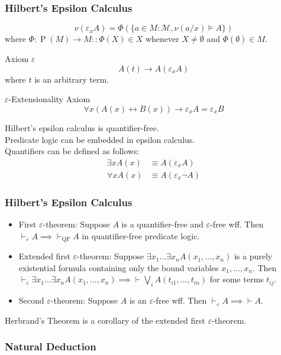 \documentclass[UTF8,11pt,colorlinks,compress,openany]{beamer}%
\begin{document}
\begin{frame}\frametitle{Hilbert's Epsilon Calculus}
\[\nu(\varepsilon_x A)=\Phi\left(\{a\in M:\mathcal{M},\nu(a/x)\vDash A\}\right)\]
where $\Phi:\operatorname{P}(M)\to M :: \Phi(X)\in X$ whenever $X\ne\emptyset$ and $\Phi(\emptyset)\in M$.
\begin{block}{Axiom $\varepsilon$}
\[A(t)\to A(\varepsilon_xA)\]
where $t$ is an arbitrary term.
\end{block}
\begin{block}{$\varepsilon$-Extensionality Axiom}
\[\forall x(A(x)\leftrightarrow B(x))\to \varepsilon_xA=\varepsilon_x B\]
\end{block}
Hilbert's epsilon calculus is quantifier-free.\\Predicate logic can be embedded in epsilon calculus.\\
Quantifiers can be defined as follows:
\begin{align*}
\exists x A(x)&\equiv A(\varepsilon_x A)\\
\forall x A(x)&\equiv A(\varepsilon_x\neg A)
\end{align*}
\end{frame}

\begin{frame}\frametitle{Hilbert's Epsilon Calculus}
\begin{itemize}
	\item First $\varepsilon$-theorem: Suppose $A$ is a quantifier-free and $\varepsilon$-free wff. Then $\vdash_\varepsilon A\implies\vdash_{\mathrm{QF}} A$ in quantifier-free predicate logic.
	\item Extended first $\varepsilon$-theorem: Suppose $\exists x_1\dots\exists x_n A(x_1,\dots,x_n)$ is a purely existential formula containing only the bound variables $x_1,\dots,x_n$. Then $\vdash_\varepsilon\exists x_1\dots\exists x_n A(x_1,\dots,x_n)\implies\vdash\bigvee\limits_i A(t_{i1},\dots,t_{in})$ for some terms $t_{ij}$.
	\item Second $\varepsilon$-theorem: Suppose $A$ is an $\varepsilon$-free wff. Then $\vdash_\varepsilon A\implies \vdash A$.
\end{itemize}
Herbrand's Theorem is a corollary of the extended first $\varepsilon$-theorem.
\end{frame}

\subsubsection{Natural Deduction}
\end{document}
